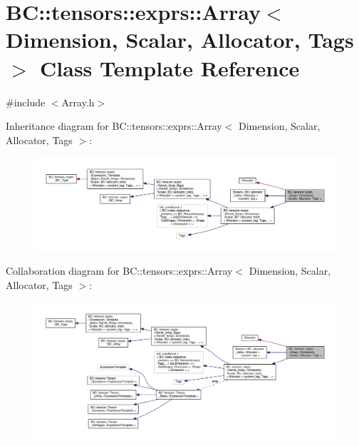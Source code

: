 \hypertarget{classBC_1_1tensors_1_1exprs_1_1Array}{}\section{BC\+:\+:tensors\+:\+:exprs\+:\+:Array$<$ Dimension, Scalar, Allocator, Tags $>$ Class Template Reference}
\label{classBC_1_1tensors_1_1exprs_1_1Array}


{\ttfamily \#include $<$Array.\+h$>$}



Inheritance diagram for BC\+:\+:tensors\+:\+:exprs\+:\+:Array$<$ Dimension, Scalar, Allocator, Tags $>$\+:
\nopagebreak
\begin{figure}[H]
\begin{center}
\leavevmode
\includegraphics[width=350pt]{classBC_1_1tensors_1_1exprs_1_1Array__inherit__graph}
\end{center}
\end{figure}


Collaboration diagram for BC\+:\+:tensors\+:\+:exprs\+:\+:Array$<$ Dimension, Scalar, Allocator, Tags $>$\+:
\nopagebreak
\begin{figure}[H]
\begin{center}
\leavevmode
\includegraphics[width=350pt]{classBC_1_1tensors_1_1exprs_1_1Array__coll__graph}
\end{center}
\end{figure}
